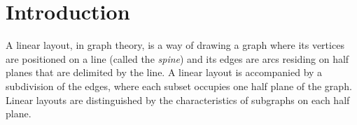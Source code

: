 
\chapter{Introduction}\label{Introduction}
A linear layout, in graph theory, is a way of drawing a graph where its vertices are positioned on a line (called the \textit{spine}) and its edges are arcs residing on half planes that are delimited by the line. A linear layout is accompanied by a subdivision of the edges, where each subset occupies one half plane of the graph.\\
Linear layouts are distinguished by the characteristics of subgraphs on each half plane. 




